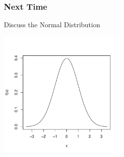 \documentclass[handout]{beamer}
\begin{document}
\begin{frame}[fragile]
\frametitle{Next Time}

Discuss the Normal Distribution

\begin{center}
   \includegraphics[width=2.5in]{figure/standard_normal.pdf} 
\end{center}

\end{frame}
\end{document}

